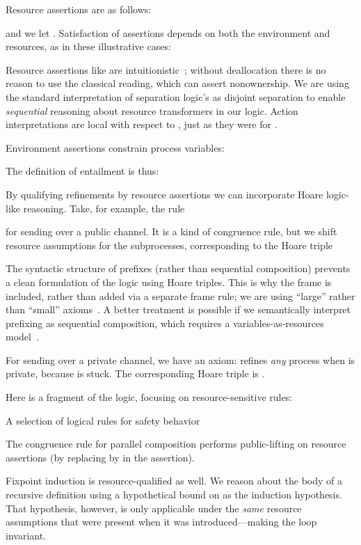 \documentclass{entcs}
\begin{document}
Resource assertions  are as follows:

and we let .  Satisfaction of
assertions depends on both the environment and resources, as in these
illustrative cases:

Resource assertions like  are
intuitionistic~\cite{Reynolds2002}; without deallocation there is no
reason to use the classical reading, which can assert nonownership.
We are using the standard interpretation of separation logic's  as
disjoint separation to enable \emph{sequential} reasoning about
resource transformers in our logic.  Action interpretations
 are local with respect to , just as they were for
.

Environment assertions  constrain process variables:


The definition of entailment is thus:

By qualifying refinements by resource assertions we can incorporate
Hoare logic-like reasoning.  Take, for example, the rule

for sending over a public channel.  It is a kind of congruence rule,
but we shift resource assumptions for the subprocesses, corresponding
to the Hoare triple

The syntactic structure of prefixes (rather than sequential
composition) prevents a clean formulation of the logic using Hoare
triples.  This is why the frame  is included, rather than added via
a separate frame rule; we are using ``large'' rather than ``small''
axioms~\cite{OHearn2001}.  A better treatment is possible if we
semantically interpret prefixing as sequential composition, which
requires a variables-as-resources model~\cite{Parkinson}.

For sending over a private channel, we have an axiom: 
refines \emph{any} process when  is private, because  is
stuck.  The corresponding Hoare triple is .



Here is a fragment of the logic, focusing on resource-sensitive rules:
\begin{display}[]
{A selection of logical rules for safety behavior}




\end{display}
The congruence rule for parallel composition performs public-lifting
 on resource assertions (by replacing  by  in
the assertion).

Fixpoint induction is resource-qualified as well.  We reason about the
body  of a recursive definition  using a hypothetical
bound on  as the induction hypothesis.  That hypothesis, however,
is only applicable under the \emph{same} resource assumptions  that
were present when it was introduced---making  the loop invariant.
\end{document}
